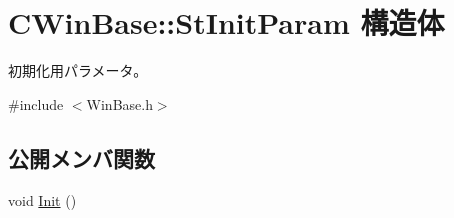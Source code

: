 \hypertarget{struct_c_win_base_1_1_st_init_param}{}\section{C\+Win\+Base\+:\+:St\+Init\+Param 構造体}
\label{struct_c_win_base_1_1_st_init_param}


初期化用パラメータ。  




{\ttfamily \#include $<$Win\+Base.\+h$>$}

\subsection*{公開メンバ関数}
\begin{DoxyCompactItemize}
\item 
void \hyperlink{struct_c_win_base_1_1_st_init_param_acf307e4d53a4c49b9f5f727ab470c7be}{Init} ()
\end{DoxyCompactItemize}
